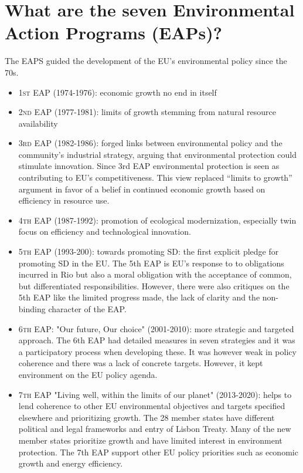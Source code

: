 \section{What are the seven Environmental Action Programs (EAPs)?}
The EAPS guided the development of the EU's environmental policy since the 70s. 
\begin{itemize}
\item \textsc{1st} EAP (1974-1976): economic growth no end in itself
\item \textsc{2nd} EAP (1977-1981): limits of growth stemming from natural resource availability
\item \textsc{3rd} EAP (1982-1986): forged links between environmental policy and the community’s industrial strategy, arguing that environmental protection could stimulate innovation. Since 3rd EAP environmental protection is seen as contributing to EU’s competitiveness. This view replaced “limits to growth” argument in favor of a belief in continued economic growth based on efficiency in resource use. 
\item \textsc{4th} EAP (1987-1992): promotion of ecological modernization, especially twin focus on efficiency and technological innovation. 
\item \textsc{5th} EAP (1993-200): towards promoting SD: the first explicit pledge for promoting SD in the EU. The 5th EAP is EU’s response to to obligations incurred in Rio but also a moral obligation with the acceptance of common, but differentiated responsibilities. However, there were also critiques on the 5th EAP like the limited progress made, the lack of clarity and the non-binding character of the EAP. 
\item \textsc{6th} EAP: "Our future, Our choice" (2001-2010): more strategic and targeted approach. The 6th EAP had detailed measures in seven strategies and it was a participatory process when developing these. It was however weak in policy coherence and there was a lack of concrete targets. However, it kept environment on the EU policy agenda. 
\item \textsc{7th} EAP "Living well, within the limits of our planet" (2013-2020): helps to lend coherence to other EU environmental objectives and targets specified elsewhere and prioritizing growth. The 28 member states have different political and legal frameworks and entry of Lisbon Treaty. Many of the new member states prioritize growth and have limited interest in environment protection. The 7th EAP support other EU policy priorities such as economic growth and energy efficiency. 
\end{itemize}

